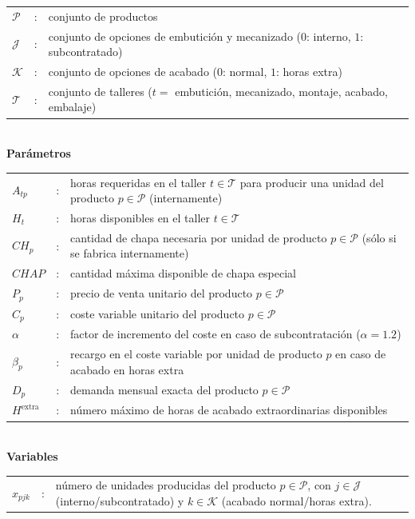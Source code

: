 \begin{tabularx}{\textwidth}{l c X}
    $\mathcal{P}$ & : & conjunto de productos \\
    $\mathcal{J}$ & : & conjunto de opciones de embutición y mecanizado ($0$: interno, $1$: subcontratado) \\
    $\mathcal{K}$ & : & conjunto de opciones de acabado ($0$: normal, $1$: horas extra) \\
    $\mathcal{T}$ & : & conjunto de talleres ($t=$ embutición, mecanizado, montaje, acabado, embalaje) \\
\end{tabularx}
\\[0.4cm]

\textbf{Parámetros}\\[0.2cm]

\begin{tabularx}{\textwidth}{l c X}
    $A_{tp}$   & : & horas requeridas en el taller $t \in \mathcal{T}$ para producir una unidad del producto $p \in \mathcal{P}$ (internamente) \\
    $H_t$      & : & horas disponibles en el taller $t \in \mathcal{T}$ \\
    $CH_p$     & : & cantidad de chapa necesaria por unidad de producto $p \in \mathcal{P}$ (sólo si se fabrica internamente) \\
    $CHAP$     & : & cantidad máxima disponible de chapa especial \\
    $P_p$      & : & precio de venta unitario del producto $p \in \mathcal{P}$ \\
    $C_p$      & : & coste variable unitario del producto $p \in \mathcal{P}$ \\
    $\alpha$   & : & factor de incremento del coste en caso de subcontratación ($\alpha = 1.2$) \\
    $\beta_p$  & : & recargo en el coste variable por unidad de producto $p$ en caso de acabado en horas extra \\
    $D_p$      & : & demanda mensual exacta del producto $p \in \mathcal{P}$ \\
    $H^{\text{extra}}$ & : & número máximo de horas de acabado extraordinarias disponibles \\
\end{tabularx}
\\[0.4cm]

\textbf{Variables}\\[0.2cm]

\begin{tabularx}{\textwidth}{l c X}
    $x_{p j k}$ & : & número de unidades producidas del producto $p \in \mathcal{P}$, con $j \in \mathcal{J}$ (interno/subcontratado) y $k \in \mathcal{K}$ (acabado normal/horas extra). \\
\end{tabularx}

